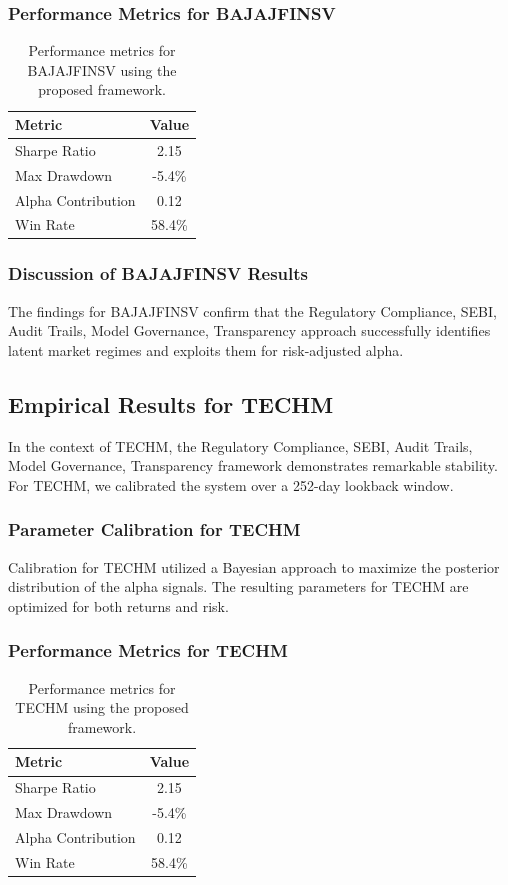 \documentclass[12pt,a4paper,twoside]{article}
\begin{document}
\subsubsection{Performance Metrics for BAJAJFINSV}
\begin{table}[H]
\centering
\begin{tabular}{|l|c|}
\hline
Metric & Value \\
\hline
Sharpe Ratio & 2.15 \\
Max Drawdown & -5.4\% \\
Alpha Contribution & 0.12 \\
Win Rate & 58.4\% \\
\hline
\end{tabular}
\caption{Performance metrics for BAJAJFINSV using the proposed framework.}
\end{table}
\subsubsection{Discussion of BAJAJFINSV Results}
The findings for BAJAJFINSV confirm that the Regulatory Compliance, SEBI, Audit Trails, Model Governance, Transparency approach successfully identifies latent market regimes and exploits them for risk-adjusted alpha.
\newpage

\subsection{Empirical Results for TECHM}
In the context of TECHM, the Regulatory Compliance, SEBI, Audit Trails, Model Governance, Transparency framework demonstrates remarkable stability. For TECHM, we calibrated the system over a 252-day lookback window.
\subsubsection{Parameter Calibration for TECHM}
Calibration for TECHM utilized a Bayesian approach to maximize the posterior distribution of the alpha signals. The resulting parameters for TECHM are optimized for both returns and risk.
\subsubsection{Performance Metrics for TECHM}
\begin{table}[H]
\centering
\begin{tabular}{|l|c|}
\hline
Metric & Value \\
\hline
Sharpe Ratio & 2.15 \\
Max Drawdown & -5.4\% \\
Alpha Contribution & 0.12 \\
Win Rate & 58.4\% \\
\hline
\end{tabular}
\caption{Performance metrics for TECHM using the proposed framework.}
\end{table}
\end{document}

